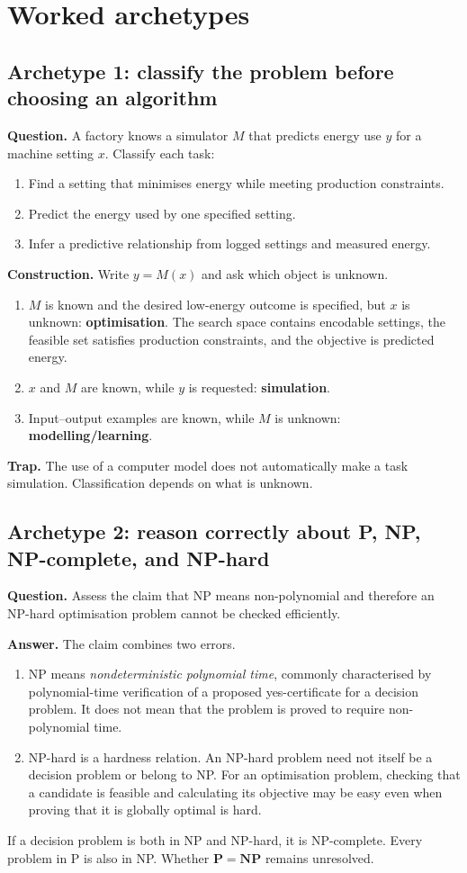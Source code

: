 \documentclass[11pt,a4paper]{article}
\begin{document}
\clearpage
\section{Worked archetypes}

\subsection{Archetype 1: classify the problem before choosing an algorithm}
\textbf{Question.} A factory knows a simulator $M$ that predicts energy use $y$ for a machine setting $x$. Classify each task:
\begin{enumerate}[label=(\alph*)]
\item Find a setting that minimises energy while meeting production constraints.
\item Predict the energy used by one specified setting.
\item Infer a predictive relationship from logged settings and measured energy.
\end{enumerate}
\textbf{Construction.} Write $y=M(x)$ and ask which object is unknown.
\begin{enumerate}[label=(\alph*)]
\item $M$ is known and the desired low-energy outcome is specified, but $x$ is unknown: \textbf{optimisation}. The search space contains encodable settings, the feasible set satisfies production constraints, and the objective is predicted energy.
\item $x$ and $M$ are known, while $y$ is requested: \textbf{simulation}.
\item Input--output examples are known, while $M$ is unknown: \textbf{modelling/learning}.
\end{enumerate}
\textbf{Trap.} The use of a computer model does not automatically make a task simulation. Classification depends on what is unknown.

\subsection{Archetype 2: reason correctly about P, NP, NP-complete, and NP-hard}
\textbf{Question.} Assess the claim that NP means non-polynomial and therefore an NP-hard optimisation problem cannot be checked efficiently.

\textbf{Answer.} The claim combines two errors.
\begin{enumerate}
\item NP means \emph{nondeterministic polynomial time}, commonly characterised by polynomial-time verification of a proposed yes-certificate for a decision problem. It does not mean that the problem is proved to require non-polynomial time.
\item NP-hard is a hardness relation. An NP-hard problem need not itself be a decision problem or belong to NP. For an optimisation problem, checking that a candidate is feasible and calculating its objective may be easy even when proving that it is globally optimal is hard.
\end{enumerate}
If a decision problem is both in NP and NP-hard, it is NP-complete. Every problem in P is also in NP. Whether $\mathbf P=\mathbf{NP}$ remains unresolved.
\end{document}
